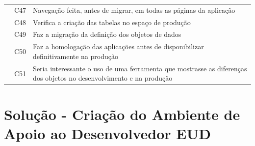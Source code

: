 \begin{longtable}{|M{4.0cm} | M{1.3cm}| m{9.5cm}|}
                                                      & C47            & Navegação feita, antes de migrar, em todas as páginas da aplicação                                                                                                                                                                                               \\ 
                                                      & C48            & Verifica a criação das tabelas no espaço de produção                                                                                                                                                                                                             \\ 
                                                      & C49            & Faz a migração da definição dos objetos de dados                                                                                                                                                                                                                 \\ 
                                                      & C50            & Faz a homologação das aplicações antes de disponibilizar definitivamente na produção                                                                                                                                                                             \\ 
                                                      & C51            & Seria interessante o uso de uma ferramenta que mostrasse as diferenças dos objetos no desenvolvimento e na produção                                                                                                                                              \\ \hline
\end{longtable}

\section{Solução - Criação do Ambiente de Apoio ao Desenvolvedor EUD}

